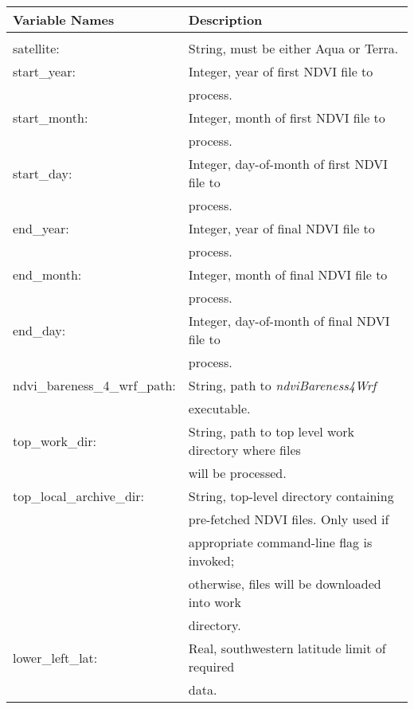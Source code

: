 \documentclass{article}
\begin{document}
\begin{tabular}{|l|l|} \hline
Variable Names          & Description \\ \hline
[GIMMS\_MODIS]          & \\ \hline
satellite:              & String, must be either Aqua or Terra. \\ \hline
start\_year:            & Integer, year of first NDVI file to \\
                        & process. \\ \hline
start\_month:           & Integer, month of first NDVI file to \\
                        & process. \\ \hline
start\_day:             & Integer, day-of-month of first NDVI file to \\
                        & process. \\ \hline
end\_year:              & Integer, year of final NDVI file to \\ 
                        & process. \\ \hline
end\_month:             & Integer, month of final NDVI file to \\
                        & process. \\ \hline
end\_day:               & Integer, day-of-month of final NDVI file to \\
                        & process. \\ \hline
ndvi\_bareness\_4\_wrf\_path: & String, path to \textit{ndviBareness4Wrf} \\
                              & executable. \\ \hline
top\_work\_dir: & String, path to top level work directory where files \\
                & will be processed. \\ \hline
top\_local\_archive\_dir: & String, top-level directory containing \\
                          & pre-fetched NDVI files.  Only used if \\
                          & appropriate command-line flag is invoked; \\
                          & otherwise, files will be downloaded into work \\
                          & directory. \\ \hline
lower\_left\_lat: & Real, southwestern latitude limit of required \\
                  & data. \\ \hline

\end{tabular}
\end{document}
